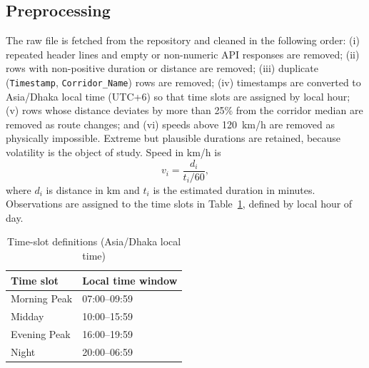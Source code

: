 \documentclass[conference]{IEEEtran}
\begin{document}
\subsection{Preprocessing}
The raw file is fetched from the repository and cleaned in the following order: (i) repeated header lines and empty or non-numeric API responses are removed; (ii) rows with non-positive duration or distance are removed; (iii) duplicate (\texttt{Timestamp}, \texttt{Corridor\_Name}) rows are removed; (iv) timestamps are converted to Asia/Dhaka local time (UTC+6) so that time slots are assigned by local hour; (v) rows whose distance deviates by more than 25\% from the corridor median are removed as route changes; and (vi) speeds above 120~km/h are removed as physically impossible. Extreme but plausible durations are retained, because volatility is the object of study. Speed in km/h is
\begin{equation}
v_i = \frac{d_i}{t_i/60},
\label{eq:speed}
\end{equation}
where $d_i$ is distance in km and $t_i$ is the estimated duration in minutes. Observations are assigned to the time slots in Table~\ref{tab:slotdef}, defined by local hour of day.

\begin{table}[!t]
\caption{Time-slot definitions (Asia/Dhaka local time)}
\label{tab:slotdef}
\centering\footnotesize
\begin{tabular}{ll}
\toprule
Time slot & Local time window \\
\midrule
Morning Peak & 07:00--09:59 \\
Midday & 10:00--15:59 \\
Evening Peak & 16:00--19:59 \\
Night & 20:00--06:59 \\
\bottomrule
\end{tabular}
\end{table}
\end{document}
